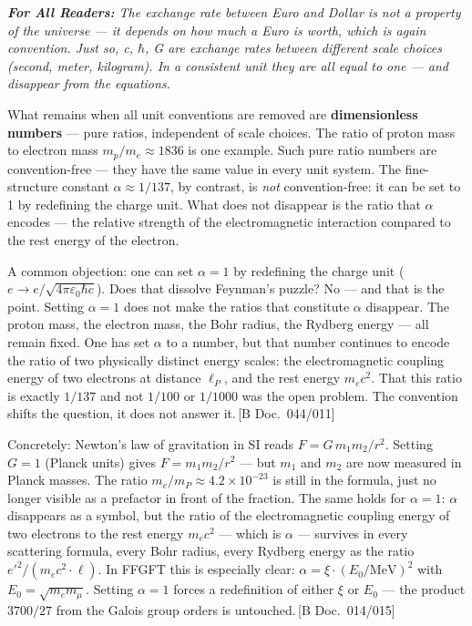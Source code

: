 \documentclass[11pt,oneside]{book}
\newcommand{\status}[1]{\penalty10000\,{\scriptsize\textcolor{gray!60}{[#1]}}}
\newenvironment{laierspur}{%
  \par\vspace{4pt}%
  \noindent\small\itshape\color{blue!60!black}%
  \textbf{For All Readers:}\enspace\ignorespaces}{%
  \par\vspace{4pt}\normalsize\normalfont\normalcolor}
\begin{document}
\begin{laierspur}
The exchange rate between Euro and Dollar is not a property of the
universe — it depends on how much a Euro is worth, which is again
convention. Just so, c, $\hbar$, G are exchange rates between different scale
choices (second, meter, kilogram). In a consistent unit they are all equal
to one — and disappear from the equations.
\end{laierspur}

What remains when all unit conventions are removed are \textbf{dimensionless
numbers} --- pure ratios, independent of scale choices. The ratio of proton mass to electron
mass $m_p/m_e \approx 1836$ is one example. Such pure ratio numbers are
convention-free --- they have the same value in every unit system.
The fine-structure constant $\alpha \approx 1/137$, by contrast, is
\textit{not} convention-free: it can be set to 1 by redefining the charge
unit. What does not disappear is the ratio that $\alpha$ encodes --- the
relative strength of the electromagnetic interaction compared to the rest
energy of the electron.

A common objection: one can set $\alpha = 1$ by redefining the charge unit
($e \to e/\sqrt{4\pi\varepsilon_0\hbar c}$). Does that dissolve Feynman's
puzzle? No --- and that is the point. Setting $\alpha = 1$ does not make the
ratios that constitute $\alpha$ disappear. The proton mass, the electron mass,
the Bohr radius, the Rydberg energy --- all remain fixed. One has set $\alpha$
to a number, but that number continues to encode the ratio of two physically
distinct energy scales: the electromagnetic coupling energy of two electrons
at distance $\ell_P$, and the rest energy $m_e c^2$. That this ratio is exactly $1/137$ and not $1/100$ or $1/1000$
was the open problem. The convention shifts the question, it does not answer it.\status{B Doc.~044/011}

Concretely: Newton's law of gravitation in SI reads
$F = G\,m_1 m_2/r^2$. Setting $G=1$ (Planck units) gives
$F = m_1 m_2/r^2$ --- but $m_1$ and $m_2$ are now measured in Planck
masses. The ratio $m_e/m_P \approx 4.2\times10^{-23}$ is still in the
formula, just no longer visible as a prefactor in front of the fraction.
The same holds for $\alpha=1$: $\alpha$ disappears as a symbol, but the
ratio of the electromagnetic coupling energy of two electrons to the
rest energy $m_e c^2$ --- which is $\alpha$ --- survives in every
scattering formula, every Bohr radius, every Rydberg energy as the
ratio $e'^2/(m_e c^2 \cdot \ell)$.
In FFGFT this is especially clear: $\alpha = \xi\cdot(E_0/\mathrm{MeV})^2$
with $E_0 = \sqrt{m_e m_\mu}$. Setting $\alpha=1$ forces a redefinition
of either $\xi$ or $E_0$ --- the product $3700/27$ from the Galois group
orders is untouched.\status{B Doc.~014/015}
\end{document}
